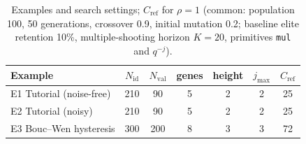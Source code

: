 \begin{table}[!htbp]
\centering
\caption{Examples and search settings; $C_\mathrm{ref}$ for $\rho=1$ (common: population 100, 50 generations, crossover 0.9, initial mutation 0.2; baseline elite retention 10\%, multiple-shooting horizon $K=20$, primitives \texttt{mul} and $q^{-j}$).}
\label{tab:setup}
\setlength{\tabcolsep}{4pt}
\begin{tabular}{lcccccc}
\toprule
Example & $N_\mathrm{id}$ & $N_\mathrm{val}$ & genes & height & $j_{\max}$ & $C_\mathrm{ref}$ \\
\midrule
E1 Tutorial (noise-free) & 210 & 90 & 5 & 2 & 2 & 25 \\
E2 Tutorial (noisy) & 210 & 90 & 5 & 2 & 2 & 25 \\
E3 Bouc--Wen hysteresis & 300 & 200 & 8 & 3 & 3 & 72 \\
\bottomrule
\end{tabular}
\end{table}
